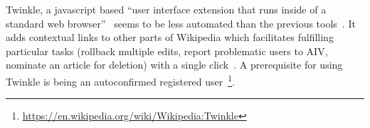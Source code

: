 Twinkle, a javascript based ``user interface extension that runs inside of a standard web browser''~\cite{GeiRib2010} seems to be less automated than the previous tools~\cite{GeiHal2013}.
It adds contextual links to other parts of Wikipedia which facilitates fulfilling particular tasks (rollback multiple edits, report problematic users to AIV, nominate an article for deletion) with a single click~\cite{GeiRib2010}.
A prerequisite for using Twinkle is being an autoconfirmed registered user~\footnote{\url{https://en.wikipedia.org/wiki/Wikipedia:Twinkle}}.

